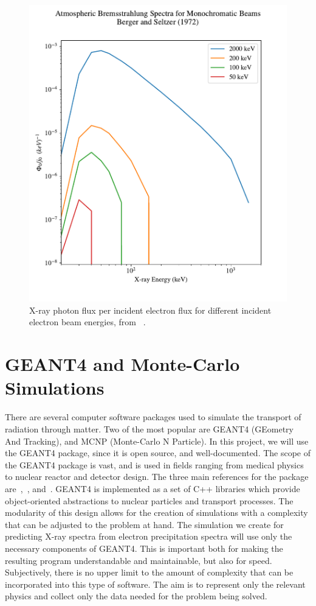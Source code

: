 \begin{figure}[p]
\label{berger_seltzer_curves_2}
\centering
\includegraphics[width=1.0\textwidth]{figures/chapter_3/berger-seltzer-curves/berger_seltzer_curves_3}
\caption{X-ray photon flux per incident electron flux for different incident electron beam energies, from ~\cite{Berger1972}. }
\end{figure}

\section{GEANT4 and Monte-Carlo Simulations}

There are several computer software packages used to simulate the transport of radiation through matter. Two of the most  popular are GEANT4 (GEometry And Tracking), and MCNP (Monte-Carlo N Particle). In this project, we will use the GEANT4 package, since it is open source, and well-documented. The scope of the GEANT4 package is vast, and is used in fields ranging from medical physics to nuclear reactor and detector design. The three main references for the package are~\citet{Agostinelli2003},~\citet{Allison2006}, and~\citet{Allison2016}. GEANT4 is implemented as a set of C++ libraries which provide object-oriented abstractions to nuclear particles and transport processes.  The modularity of this design allows for the creation of simulations with a complexity that can be adjusted to the problem at hand. The simulation we create for predicting X-ray spectra from electron precipitation spectra will use only the necessary components of GEANT4. This is important both for making the resulting program understandable and maintainable, but also for speed. Subjectively, there is no upper limit to the amount of complexity that can be incorporated into this type of software. The aim is to represent only the relevant physics and collect only the data needed for the problem being solved. 

